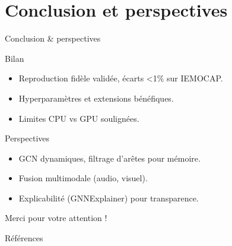 \documentclass[10pt,aspectratio=169]{beamer}
\begin{document}

\section{Conclusion et perspectives}
\begin{frame}{Conclusion \& perspectives}
  \begin{block}{Bilan}
    \begin{itemize}
      \item Reproduction fidèle validée, écarts <1\% sur IEMOCAP.
      \item Hyperparamètres et extensions bénéfiques.
      \item Limites CPU vs GPU soulignées.
    \end{itemize}
  \end{block}
  \vspace{0.5em}
  \begin{block}{Perspectives}
    \begin{itemize}
      \item GCN dynamiques, filtrage d’arêtes pour mémoire.
      \item Fusion multimodale (audio, visuel).
      \item Explicabilité (GNNExplainer) pour transparence.
    \end{itemize}
  \end{block}
  \vfill
  \begin{center}
    \Large\color{primary} Merci pour votre attention !
  \end{center}
\end{frame}

\begin{frame}[allowframebreaks]{Références}
    \printbibliography[heading=none]
  \end{frame}
\end{document}
